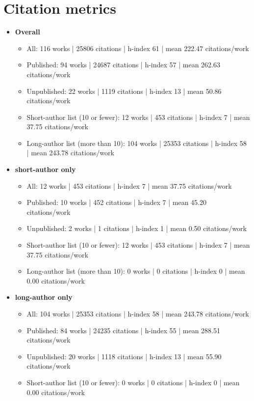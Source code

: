 \section*{Citation metrics}
\begin{itemize}
  \item \textbf{Overall}
  \begin{itemize}
    \item All: 116 works | 25806 citations | h-index 61 | mean 222.47 citations/work
    \item Published: 94 works | 24687 citations | h-index 57 | mean 262.63 citations/work
    \item Unpublished: 22 works | 1119 citations | h-index 13 | mean 50.86 citations/work
    \item Short-author list (10 or fewer): 12 works | 453 citations | h-index 7 | mean 37.75 citations/work
    \item Long-author list (more than 10): 104 works | 25353 citations | h-index 58 | mean 243.78 citations/work
  \end{itemize}
  \item \textbf{short-author only}
  \begin{itemize}
    \item All: 12 works | 453 citations | h-index 7 | mean 37.75 citations/work
    \item Published: 10 works | 452 citations | h-index 7 | mean 45.20 citations/work
    \item Unpublished: 2 works | 1 citations | h-index 1 | mean 0.50 citations/work
    \item Short-author list (10 or fewer): 12 works | 453 citations | h-index 7 | mean 37.75 citations/work
    \item Long-author list (more than 10): 0 works | 0 citations | h-index 0 | mean 0.00 citations/work
  \end{itemize}
  \item \textbf{long-author only}
  \begin{itemize}
    \item All: 104 works | 25353 citations | h-index 58 | mean 243.78 citations/work
    \item Published: 84 works | 24235 citations | h-index 55 | mean 288.51 citations/work
    \item Unpublished: 20 works | 1118 citations | h-index 13 | mean 55.90 citations/work
    \item Short-author list (10 or fewer): 0 works | 0 citations | h-index 0 | mean 0.00 citations/work

\end{itemize}
\end{itemize}
